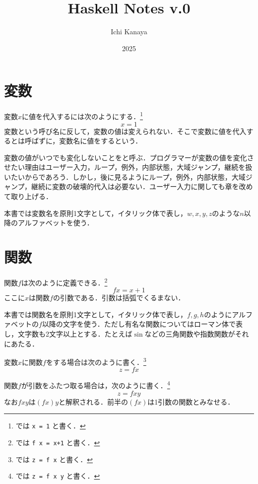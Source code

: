 \documentclass[platex,a5paper,twoside,fleqn,draft]{jsbook}
\title{Haskell Notes v.0}
\author{Ichi Kanaya}
\date{2025}
\newcommand{\keyword}[1]{\textgt{#1}}
\begin{document}
\maketitle

\section{変数}

変数$x$に値を代入するには次のようにする．\footnote{\haskell では \verb|x = 1| と書く．}
\begin{equation}
x=1
\end{equation}
変数という呼び名に反して，変数の値は変えられない．そこで変数に値を代入するとは呼ばずに，変数名に値を\keyword{束縛}するという．

変数の値がいつでも変化しないことを\keyword{参照透過性}と呼ぶ．プログラマーが変数の値を変化させたい理由はユーザー入力，ループ，例外，内部状態，大域ジャンプ，継続を扱いたいからであろう．しかし，後に見るようにループ，例外，内部状態，大域ジャンプ，継続に変数の破壊的代入は必要ない．ユーザー入力に関しても章を改めて取り上げる．

本書では変数名を原則1文字として，イタリック体で表し，$w,x,y,z$のような$n$以降のアルファベットを使う．

\section{関数}

関数$f$は次のように定義できる．\footnote{\haskell では \verb|f x = x+1| と書く．}
\begin{equation}
fx=x+1
\end{equation}
ここに$x$は関数$f$の引数である．引数は括弧でくるまない．

本書では関数名を原則1文字として，イタリック体で表し，$f,g,h$のようにアルファベットの$f$以降の文字を使う．ただし有名な関数についてはローマン体で表し，文字数も2文字以上とする．たとえば$\sin$などの三角関数や指数関数がそれにあたる．

変数$x$に関数$f$を\keyword{適用}する場合は次のように書く．\footnote{\haskell では \verb|z = f x| と書く．}
\begin{equation}
z=fx
\end{equation}

関数$f$が引数をふたつ取る場合は，次のように書く．\footnote{\haskell では \verb|z = f x y| と書く．}
\begin{equation}
z=fxy
\end{equation}
なお$fxy$は$(fx)y$と解釈される．前半の$(fx)$は1引数の関数とみなせる．
\end{document}
